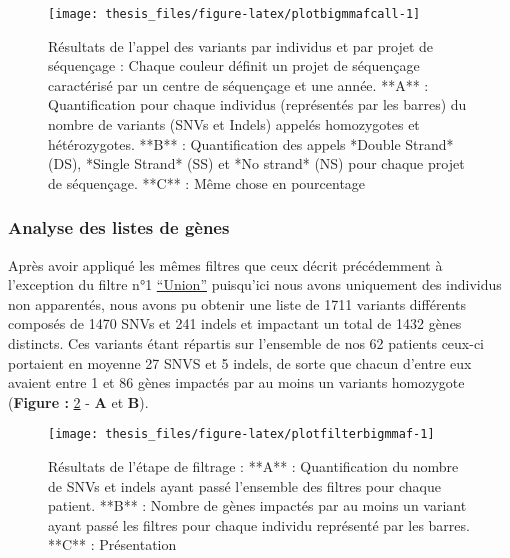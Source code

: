 \documentclass[12pt,twoside]{reedthesis}
\theoremstyle{definition}
\theoremstyle{definition}
\theoremstyle{remark}
\begin{document}
  \newpage
  
  \begin{figure}
  
  {\centering \texttt{[image: thesis\_files/figure-latex/plotbigmmafcall-1]} 
  
  }
  
  \caption[Résultats de l'appel des variants par individus et par projet de séquençage]{Résultats de l'appel des variants par individus et par projet de séquençage : Chaque couleur définit un projet de séquençage caractérisé par un centre de séquençage et une année. **A** : Quantification pour chaque individus (représentés par les barres) du nombre de variants (SNVs et Indels) appelés homozygotes et hétérozygotes. **B** : Quantification des appels *Double Strand* (DS), *Single Strand* (SS) et *No strand* (NS) pour chaque projet de séquençage. **C** : Même chose en pourcentage}\label{fig:plotbigmmafcall}
  \end{figure}
  
  \newpage
  
  \subsubsection{Analyse des listes de
  gènes}\label{analyse-des-listes-de-genes}
  
  Après avoir appliqué les mêmes filtres que ceux décrit précédemment à
  l'exception du filtre n°1
  \protect\hyperlink{filterdescription}{``Union''} puisqu'ici nous avons
  uniquement des individus non apparentés, nous avons pu obtenir une liste
  de 1711 variants différents composés de 1470 SNVs et 241 indels et
  impactant un total de 1432 gènes distincts. Ces variants étant répartis
  sur l'ensemble de nos 62 patients ceux-ci portaient en moyenne 27 SNVS
  et 5 indels, de sorte que chacun d'entre eux avaient entre 1 et 86 gènes
  impactés par au moins un variants homozygote (\textbf{Figure :
  }\ref{fig:plotfilterbigmmaf} - \textbf{A} et \textbf{B}).
  
  \begin{figure}
  
  {\centering \texttt{[image: thesis\_files/figure-latex/plotfilterbigmmaf-1]} 
  
  }
  
  \caption[Résultats de l'étape de filtrage]{Résultats de l'étape de filtrage : **A** : Quantification du nombre de SNVs et indels ayant passé l'ensemble des filtres pour chaque patient. **B** : Nombre de gènes impactés par au moins un variant ayant passé les filtres pour chaque individu représenté par les barres. **C** : Présentation }\label{fig:plotfilterbigmmaf}
  \end{figure}
  
\end{document}
